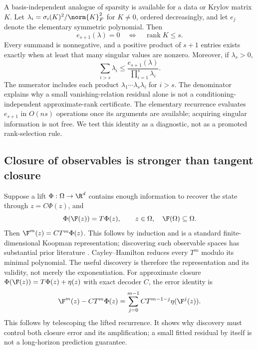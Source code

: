 A basis-independent analogue of sparsity is available for a data or
Krylov matrix $K$. Let $\lambda_i=\sigma_i(K)^2/\norm{K}_F^2$ for $K\ne0$,
ordered decreasingly, and let $e_j$ denote the elementary symmetric polynomial.
Then
\begin{equation}
 e_{s+1}(\lambda)=0\quad\Longleftrightarrow\quad\operatorname{rank}K\leq s.
 \label{eq:rankesp}
\end{equation}
Every summand is nonnegative, and a positive product of $s+1$ entries exists
exactly when at least that many singular values are nonzero. Moreover,
if $\lambda_s>0$,
\begin{equation}
 \sum_{i>s}\lambda_i
 \leq \frac{e_{s+1}(\lambda)}{\prod_{i=1}^{s}\lambda_i}. \label{eq:esptail}
\end{equation}
The numerator includes each product $\lambda_1\cdots\lambda_s\lambda_i$
for $i>s$. The denominator explains why a small vanishing-relation residual
alone is not a conditioning-independent approximate-rank certificate.
The elementary recurrence evaluates $e_{s+1}$ in $O(ns)$ operations once
its arguments are available; acquiring singular information is not free.
We test this identity as a diagnostic, not as a promoted rank-selection rule.

\subsection{Closure of observables is stronger than tangent closure}
Suppose a lift $\Phi:\Omega\to\R^d$ contains enough information to recover
the state through $z=C\Phi(z)$, and
\begin{equation}
 \Phi(\F(z))=T\Phi(z),\qquad z\in\Omega,\quad \F(\Omega)\subseteq\Omega.
 \label{eq:liftclosure}
\end{equation}
Then $\F^m(z)=CT^m\Phi(z)$. This follows by induction and is a standard
finite-dimensional Koopman representation; discovering such observable
spaces has substantial prior literature \cite{brunton,ssd}. Cayley--Hamilton
reduces every $T^m$ modulo its minimal polynomial. The useful discovery is
therefore the representation and its validity, not merely the exponentiation.
For approximate closure
$\Phi(\F(z))=T\Phi(z)+\eta(z)$ with exact decoder $C$, the error identity is
\begin{equation}
 \F^m(z)-CT^m\Phi(z)
 =\sum_{j=0}^{m-1}CT^{m-1-j}\eta(\F^j(z)).
 \label{eq:liftdefect}
\end{equation}
This follows by telescoping the lifted recurrence. It shows why discovery
must control both closure error and its amplification; a small fitted
residual by itself is not a long-horizon prediction guarantee.

